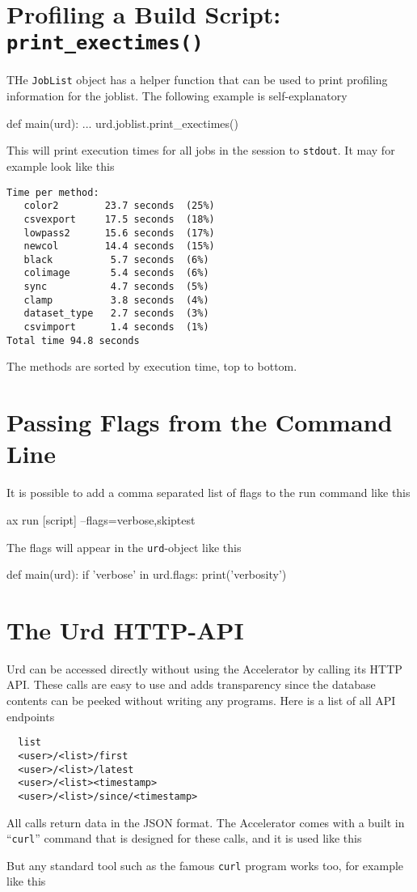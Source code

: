 \section{Profiling a Build Script:  \texttt{print\_exectimes()}}
THe \texttt{JobList} object has a helper function that can be used to
print profiling information for the joblist.  The following example is
self-explanatory
\begin{python}
def main(urd):
    ...
    urd.joblist.print_exectimes()
\end{python}
This will print execution times for all jobs in the session
to \texttt{stdout}.  It may for example look like this
\begin{verbatim}
Time per method:
   color2        23.7 seconds  (25%)
   csvexport     17.5 seconds  (18%)
   lowpass2      15.6 seconds  (17%)
   newcol        14.4 seconds  (15%)
   black          5.7 seconds  (6%)
   colimage       5.4 seconds  (6%)
   sync           4.7 seconds  (5%)
   clamp          3.8 seconds  (4%)
   dataset_type   2.7 seconds  (3%)
   csvimport      1.4 seconds  (1%)
Total time 94.8 seconds
\end{verbatim}
The methods are sorted by execution time, top to bottom.



\section{Passing Flags from the Command Line}
It is possible to add a comma separated list of flags to the run command
like this
\begin{python}
ax run [script] --flags=verbose,skiptest
\end{python}
The flags will appear in the \texttt{urd}-object like this
\begin{python}
def main(urd):
    if 'verbose' in urd.flags:
       print('verbosity')
\end{python}



\section{The Urd HTTP-API}
Urd can be accessed directly without using the Accelerator by calling
its HTTP API.  These calls are easy to use and adds transparency since
the database contents can be peeked without writing any programs.
Here is a list of all API endpoints
\begin{verbatim}
  list
  <user>/<list>/first
  <user>/<list>/latest
  <user>/<list><timestamp>
  <user>/<list>/since/<timestamp>
\end{verbatim}
All calls return data in the JSON format.  The Accelerator comes with
a built in ``\texttt{curl}'' command that is designed for these calls,
and it is used like this
\begin{shell}
\end{shell}
But any standard tool such as the famous \texttt{curl} program works
too, for example like this
\begin{shell}
\end{shell}


